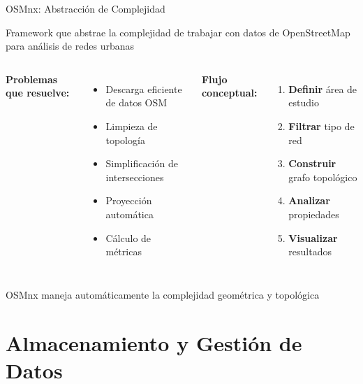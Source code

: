 \documentclass[10pt,aspectratio=169]{beamer}
\newcommand{\conceptbox}[2]{
\begin{tcolorbox}[colframe=usachblue,colback=blue!5,title=#1,fonttitle=\bfseries]
#2
\end{tcolorbox}
}
\newcommand{\alertbox}[1]{
\begin{tcolorbox}[colframe=red!70,colback=red!5]
\centering\faExclamationTriangle\space #1
\end{tcolorbox}
}
\begin{document}
\begin{frame}{OSMnx: Abstracción de Complejidad}
    \conceptbox{¿Qué es OSMnx?}{
        Framework que abstrae la complejidad de trabajar con datos de OpenStreetMap para análisis de redes urbanas
    }
    
    \begin{columns}[T]
        \textbf{Problemas que resuelve:}
        \begin{itemize}
            \item Descarga eficiente de datos OSM
            \item Limpieza de topología
            \item Simplificación de intersecciones
            \item Proyección automática
            \item Cálculo de métricas
        \end{itemize}
        
        \textbf{Flujo conceptual:}
        \begin{enumerate}
            \item \textbf{Definir} área de estudio
            \item \textbf{Filtrar} tipo de red
            \item \textbf{Construir} grafo topológico
            \item \textbf{Analizar} propiedades
            \item \textbf{Visualizar} resultados
        \end{enumerate}
    \end{columns}
    
    \vspace{0.3cm}
    \alertbox{OSMnx maneja automáticamente la complejidad geométrica y topológica}
\end{frame}

\section{Almacenamiento y Gestión de Datos}
\end{document}
